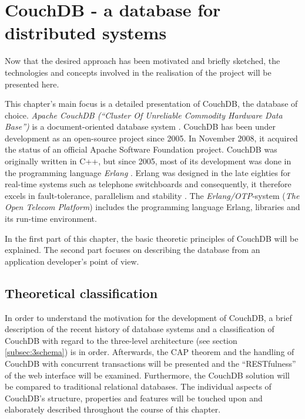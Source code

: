 \chapter{CouchDB - a database for distributed systems}
\label{chap:couchdb}

Now that the desired approach has been motivated and briefly sketched, the technologies and concepts involved in the realisation of the project will be presented here.

This chapter's main focus is a detailed presentation of CouchDB, the database of choice. \textit{Apache CouchDB (\enquote{Cluster Of Unreliable Commodity Hardware Data Base})} is a document-oriented database system \cite{couch:homepage}. CouchDB has been under development as an open-source project since 2005. In November 2008, it acquired the status of an official Apache Software Foundation \cite{couchdb:apache} project. CouchDB was originally written in C++, but since 2005, most of its development was done in the programming language \textit{Erlang} \cite{erlang:homepage}. Erlang was designed in the late eighties for real-time systems such as telephone switchboards and consequently, it therefore excels in fault-tolerance, parallelism and stability \cite{couchdb:ibm}. The \textit{Erlang/OTP}-system (\textit{The Open Telecom Platform}) includes the programming language Erlang, libraries and its run-time environment.

In the first part of this chapter, the basic theoretic principles of CouchDB will be explained. The second part focuses on describing the database from an application developer's point of view.

\section{Theoretical classification}
\label{sec:theoretisch-couchdb}

In order to understand the motivation for the development of CouchDB, a brief description of the recent history of database systems and a classification of CouchDB with regard to the three-level architecture (see section \ref{subsec:3schema}) is in order. Afterwards, the CAP theorem and the handling of CouchDB with concurrent transactions will be presented and the \enquote{RESTfulness} of the web interface will be examined. Furthermore, the CouchDB solution will be compared to traditional relational databases. The individual aspects of CouchDB's structure, properties and features will be touched upon and elaborately described throughout the course of this chapter.

